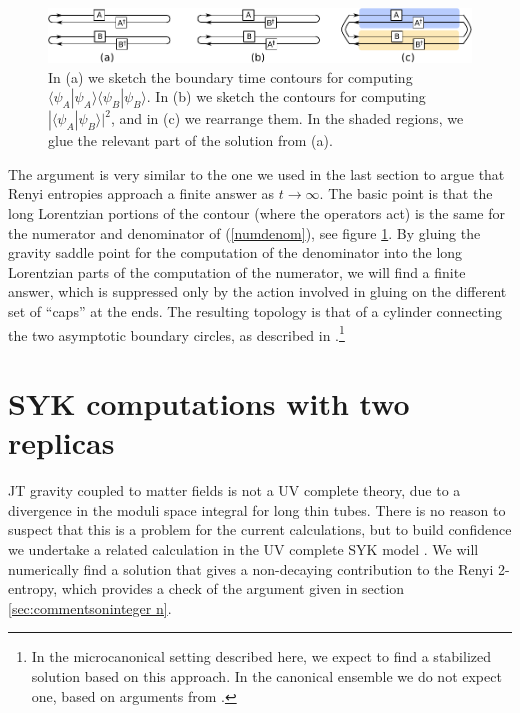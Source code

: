 \documentclass[11pt]{article}
\numberwithin{equation}{section}
\begin{document}
\begin{figure}[t]
\begin{center}
\includegraphics[width = \textwidth]{images/contours4.pdf}
\caption{{\small In (a) we sketch the boundary time contours for computing $\langle \psi_A|\psi_A\rangle\langle \psi_B|\psi_B\rangle$. In (b) we sketch the contours for computing $|\langle \psi_A|\psi_B\rangle|^2$, and in (c) we rearrange them. In the shaded regions, we glue the relevant part of the solution from (a).}}\label{fig:contours4}
\end{center}
\end{figure}
The argument is very similar to the one we used in the last section to argue that Renyi entropies approach a finite answer as $t\rightarrow \infty$. The basic point is that the long Lorentzian portions of the contour (where the operators act) is the same for the numerator and denominator of (\ref{numdenom}), see figure \ref{fig:contours4}. By gluing the gravity saddle point for the computation of the denominator into the long Lorentzian parts of the computation of the numerator, we will find a finite answer, which is suppressed only by the action involved in gluing on the different set of ``caps'' at the ends. The resulting topology is that of a cylinder connecting the two asymptotic boundary circles, as described in \cite{Saad:2019pqd}.\footnote{In the microcanonical setting described here, we expect to find a stabilized solution based on this approach. In the canonical ensemble we do not expect one, based on arguments from \cite{Saad:2018bqo,Saad:2019pqd}.}




\section{SYK computations with two replicas}\label{sec:SYK}
JT gravity coupled to matter fields is not a UV complete theory, due to a divergence in the moduli space integral for long thin tubes. There is no reason to suspect that this is a  problem for the current calculations, but to build confidence we undertake a related calculation in the UV complete SYK model \cite{Sachdev:1992fk,KitaevTalks,Kitaev:2017awl}. We will numerically find a solution that gives a non-decaying contribution to the Renyi 2-entropy, which provides a check of the argument given in section \ref{sec:commentsoninteger n}.
\end{document}
